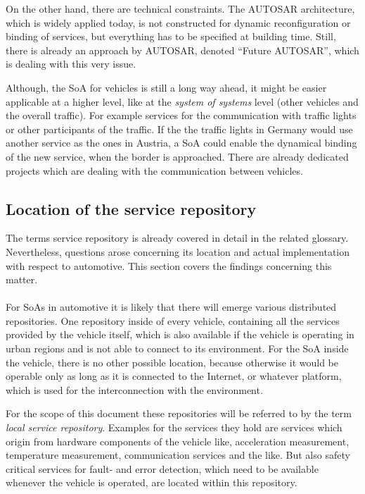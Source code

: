 On the other hand, there are technical constraints. The AUTOSAR architecture, which is widely applied today, is not constructed for dynamic reconfiguration or binding of services, but everything has to be specified at building time. Still, there is already an approach by AUTOSAR, denoted ``Future AUTOSAR'', which is dealing with this very issue.

Although, the SoA for vehicles is still a long way ahead, it might be easier applicable at a higher level, like at the \emph{system of systems} level (other vehicles and the overall traffic). For example services for the communication with traffic lights or other participants of the traffic. If the the traffic lights in Germany would use another service as the ones in Austria, a SoA could enable the dynamical binding of the new service, when the border is approached. There are already dedicated projects which are dealing with the communication between vehicles.


\subsection{Location of the service repository}
The terms service repository is already covered in detail in the related glossary. Nevertheless, questions arose concerning its location and actual implementation with respect to automotive. This section covers the findings concerning this matter.
\\
\\
For SoAs in automotive it is likely that there will emerge various distributed repositories. One repository inside of every vehicle, containing all the services provided by the vehicle itself, which is also available if the vehicle is operating in urban regions and is not able to connect to its environment. For the SoA inside the vehicle, there is no other possible location, because otherwise it would be operable only as long as it is connected to the Internet, or whatever platform, which is used for the interconnection with the environment.

For the scope of this document these repositories will be referred to by the term \emph{local service repository}. Examples for the services they hold are services which origin from hardware components of the vehicle like, acceleration measurement, temperature measurement, communication services and the like. But also safety critical services for fault- and error detection, which need to be available whenever the vehicle is operated, are located within this repository.

